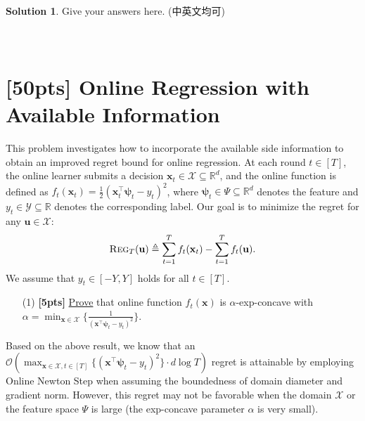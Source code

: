 \documentclass[a4paper]{article}
\numberwithin{equation}{section}
\theoremstyle{definition}
\newtheorem*{solution}{Solution}
\theoremstyle{definition}
\def \X {\mathcal{X}}
\def \O {\mathcal{O}}
\def \R {\mathbb{R}}
\def \Y {\mathcal{Y}}
\def \u {\textbf{u}}
\def \x {\textbf{x}}
\def \psib {\boldsymbol{\psi}}
\begin{document}
\begin{solution}
Give your answers here. (中英文均可)
~\\
~\\
~\\
\end{solution}

\newpage
\section{[50pts] Online Regression with Available Information}
This problem investigates how to incorporate the available side information to obtain an improved regret bound for online regression. At each round $t \in [T]$, the online learner submits a decision $\x_t \in \X \subseteq \R^d$, and the online function is defined as $f_t(\x_t) = \frac{1}{2}(\x_t^\top \psib_t - y_t)^2$, where $\psib_t \in \Psi \subseteq \R^d$ denotes the feature and $y_t \in \Y \subseteq \R$ denotes the corresponding label. Our goal is to minimize the regret for any $\u \in \X$:
\begin{align*}
  \textsc{Reg}_T(\u) \triangleq \sum_{t=1}^T f_t(\x_t) -  \sum_{t=1}^T f_t(\u).
\end{align*}
We assume that $y_t \in [-Y, Y]$ holds for all $t \in [T]$.

\begin{itemize}
  \item[(1)] \textbf{[5pts]} \underline{Prove} that online function $f_t(\x)$ is $\alpha$-exp-concave with $\alpha = \min_{\x \in \X} \big\{\frac{1}{(\x^\top \psib_t - y_t)^2} \big\}$.
\end{itemize}

\setlength{\leftskip}{0.8em}
Based on the above result, we know that an $\O\left(\max_{\x \in \X, t \in [T]}\{(\x^\top \psib_t - y_t)^2\} \cdot d\log T\right)$ regret is attainable by employing Online Newton Step when assuming the boundedness of domain diameter and gradient norm. However, this regret may not be favorable when the domain $\X$ or the feature space $\Psi$ is large (the exp-concave parameter $\alpha$ is very small). 
\end{document}
